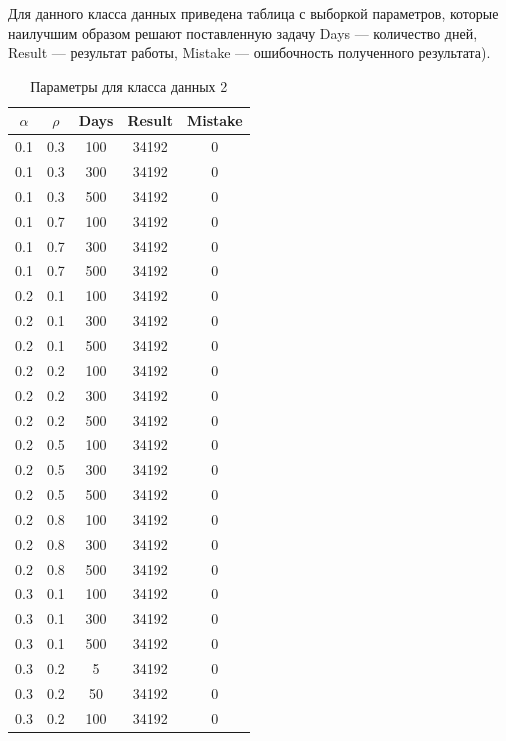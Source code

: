 Для данного класса данных приведена таблица с выборкой параметров, которые наилучшим образом решают поставленную задачу Days --- количество дней, Result --- результат работы, Mistake --- ошибочность полученного результата).

\begin{center}
	\captionsetup{justification=raggedright,singlelinecheck=off}
	\begin{longtable}[c]{|c|c|c|c|c|}
		\caption{Параметры для класса данных 2\label{tbl:table_kd2}}\\ \hline
		$\alpha$ & $\rho$ & Days & Result & Mistake \\ \hline
		0.1 &  0.3 &  100 & 34192 &     0 \\
		0.1 &  0.3 &  300 & 34192 &     0 \\
		0.1 &  0.3 &  500 & 34192 &     0 \\ \hline
		0.1 &  0.7 &  100 & 34192 &     0 \\
		0.1 &  0.7 &  300 & 34192 &     0 \\
		0.1 &  0.7 &  500 & 34192 &     0 \\ \hline
		0.2 &  0.1 &  100 & 34192 &     0 \\
		0.2 &  0.1 &  300 & 34192 &     0 \\
		0.2 &  0.1 &  500 & 34192 &     0 \\ \hline
		0.2 &  0.2 &  100 & 34192 &     0 \\
		0.2 &  0.2 &  300 & 34192 &     0 \\
		0.2 &  0.2 &  500 & 34192 &     0 \\ \hline
		0.2 &  0.5 &  100 & 34192 &     0 \\
		0.2 &  0.5 &  300 & 34192 &     0 \\
		0.2 &  0.5 &  500 & 34192 &     0 \\ \hline
		0.2 &  0.8 &  100 & 34192 &     0 \\
		0.2 &  0.8 &  300 & 34192 &     0 \\
		0.2 &  0.8 &  500 & 34192 &     0 \\ \hline
		0.3 &  0.1 &  100 & 34192 &     0 \\
		0.3 &  0.1 &  300 & 34192 &     0 \\
		0.3 &  0.1 &  500 & 34192 &     0 \\ \hline
		0.3 &  0.2 &    5 & 34192 &     0 \\
		0.3 &  0.2 &   50 & 34192 &     0 \\
		0.3 &  0.2 &  100 & 34192 &     0 \\

\end{longtable}
\end{center}
